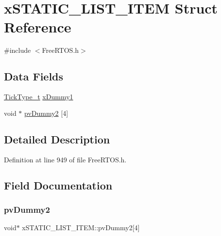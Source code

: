 \hypertarget{structx_s_t_a_t_i_c___l_i_s_t___i_t_e_m}{}\section{x\+S\+T\+A\+T\+I\+C\+\_\+\+L\+I\+S\+T\+\_\+\+I\+T\+EM Struct Reference}
\label{structx_s_t_a_t_i_c___l_i_s_t___i_t_e_m}


{\ttfamily \#include $<$Free\+R\+T\+O\+S.\+h$>$}

\subsection*{Data Fields}
\begin{DoxyCompactItemize}
\item 
\hyperlink{portmacro_8h_aa69c48c6e902ce54f70886e6573c92a9}{Tick\+Type\+\_\+t} \hyperlink{structx_s_t_a_t_i_c___l_i_s_t___i_t_e_m_abdb8e415f1bcfbba19fbf57d8d4e9438}{x\+Dummy1}
\item 
void $\ast$ \hyperlink{structx_s_t_a_t_i_c___l_i_s_t___i_t_e_m_a53c6cb2b8094f991254635d04c9be55b}{pv\+Dummy2} \mbox{[}4\mbox{]}
\end{DoxyCompactItemize}


\subsection{Detailed Description}


Definition at line 949 of file Free\+R\+T\+O\+S.\+h.



\subsection{Field Documentation}
\mbox{\label{structx_s_t_a_t_i_c___l_i_s_t___i_t_e_m_a53c6cb2b8094f991254635d04c9be55b}} 
\subsubsection{\texorpdfstring{pv\+Dummy2}{pvDummy2}}
{\footnotesize\ttfamily void$\ast$ x\+S\+T\+A\+T\+I\+C\+\_\+\+L\+I\+S\+T\+\_\+\+I\+T\+E\+M\+::pv\+Dummy2\mbox{[}4\mbox{]}}



